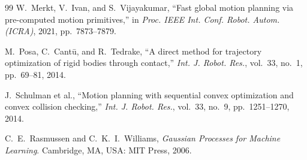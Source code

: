 \documentclass[lettersize,journal]{IEEEtran}
\begin{document}
\begin{thebibliography}{99}
W.~Merkt, V.~Ivan, and S.~Vijayakumar, ``Fast global motion planning via pre-computed motion primitives,''
in \textit{Proc. IEEE Int. Conf. Robot. Autom. (ICRA)}, 2021, pp.~7873--7879.

M.~Posa, C.~Cant\={u}, and R.~Tedrake, ``A direct method for trajectory optimization of rigid bodies through contact,''
\textit{Int. J. Robot. Res.}, vol.~33, no.~1, pp.~69--81, 2014.

J.~Schulman et al., ``Motion planning with sequential convex optimization and convex collision checking,''
\textit{Int. J. Robot. Res.}, vol.~33, no.~9, pp.~1251--1270, 2014.

C.~E.~Rasmussen and C.~K.~I.~Williams, \textit{Gaussian Processes for Machine Learning}.
Cambridge, MA, USA: MIT Press, 2006.

\end{thebibliography}
\end{document}
